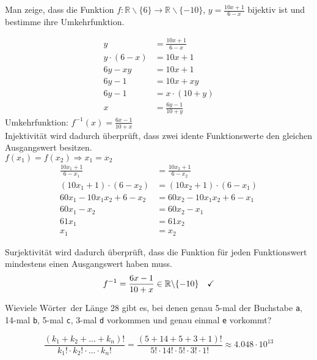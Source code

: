 \documentclass[a4paper, 12pt, margins=3cm]{homework}
\newcommand{\R}{\mathbb{R}}
\begin{document}
  \begin{problem}
    Man zeige, dass die Funktion $f: \R \backslash  \{6\} \rightarrow \R \backslash  \{-10\}$,
    $y = \frac{10x+1}{6-x}$ bijektiv ist und bestimme ihre Umkehrfunktion.
  \end{problem}
  \begin{solution}
    \begin{align*}
      y &= \frac{10x+1}{6-x} \\
      y\cdot (6-x) &= 10x+1 \\
      6y - xy &= 10x+1 \\
      6y-1 &= 10x+xy \\
      6y-1 &= x\cdot (10+y) \\
      x &= \frac{6y-1}{10+y}
    \end{align*}
    Umkehrfunktion: $f^{-1}(x)=\frac{6x-1}{10+x}$ \\

    Injektivität wird dadurch überprüft, dass zwei idente Funktionswerte den 
    gleichen Ausgangswert besitzen. \\
    $f(x_1) = f(x_2) \Longrightarrow x_1 = x_2$
    \begin{align*}
      \frac{10x_1+1}{6-x_1} &= \frac{10x_2+1}{6-x_2} \\
      (10x_1+1) \cdot (6-x_2) &= (10x_2+1) \cdot (6-x_1) \\
      60x_1 - 10x_1x_2+6-x_2 &= 60x_2-10x_1x_2+6-x_1 \\
      60x_1-x_2 &= 60x_2-x_1 \\
      61x_1 &= 61x_2 \\
      x_1 &= x_2
    \end{align*}

    Surjektivität wird dadurch überprüft, dass die Funktion für jeden Funktionswert
    mindestens einen Ausgangswert haben muss.\\

    \[ f^{-1} = \frac{6x-1}{10+x} \in \R \backslash \{-10\} \quad \text{\checkmark} \]
  \end{solution}
  
  \begin{problem}
      Wieviele \glqq Wörter\grqq\ der Länge 28 gibt es, bei denen genau 5-mal
      der Buchstabe \texttt{a}, 14-mal \texttt{b}, 5-mal \texttt{c}, 3-mal \texttt{d}
      vorkommen und genau einmal \texttt{e} vorkommt?
  \end{problem}
  \begin{solution}
    \[ 
      \frac{(k_1+k_2+...+k_n)!}{k_1! \cdot k_2! \cdot ... \cdot k_n!} = 
      \frac{(5+14+5+3+1)!}{5!\cdot 14! \cdot 5! \cdot 3! \cdot 1!}
      \approx 4.048\cdot 10^{13}
    \]
  \end{solution}
\end{document}
